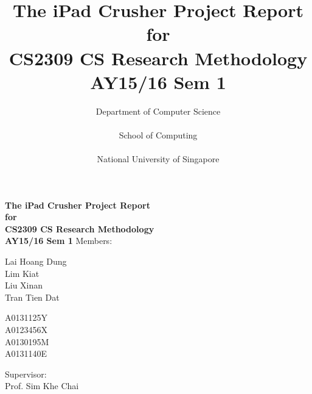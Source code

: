 \documentclass[12pt,a4paper,oneside]{report}
\begin{document}
\title{\Huge\textbf{The iPad Crusher \vfill
	\large Project Report \\ \bigskip
	for \\ \bigskip
	CS2309 CS Research Methodology \\ \bigskip
	\large AY15/16 Sem 1 \vfill}
	}
\author{
	Department of Computer Science \\\\
	School of Computing \\\\
	National University of Singapore}

\maketitle


\begin{titlepage}
\thispagestyle{plain}
\begin{center}
\textbf{\Huge The iPad Crusher \vfill
	\large Project Report \\ \bigskip
	for \\ \bigskip
	CS2309 CS Research Methodology \\ \bigskip
	AY15/16 Sem 1} \vfill \vfill
\large Members: \\ \bigskip
\begin{minipage}[t]{0.3\textwidth}
\begin{flushleft}
Lai Hoang Dung \\ \bigskip
Lim Kiat \\ \bigskip
Liu Xinan \\ \bigskip
Tran Tien Dat
\end{flushleft}
\end{minipage}
\begin{minipage}[t]{0.3\textwidth}
\begin{flushright}
A0131125Y \\ \bigskip
A0123456X \\ \bigskip
A0130195M \\ \bigskip
A0131140E
\end{flushright}
\end{minipage} \vfill
Supervisor: \\ \bigskip
Prof. Sim Khe Chai
\end{center}
\end{titlepage}
\end{document}

